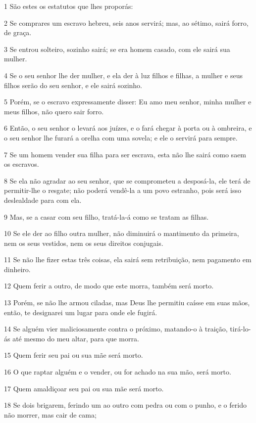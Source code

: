 \par 1 São estes os estatutos que lhes proporás:
\par 2 Se comprares um escravo hebreu, seis anos servirá; mas, ao sétimo, sairá forro, de graça.
\par 3 Se entrou solteiro, sozinho sairá; se era homem casado, com ele sairá sua mulher.
\par 4 Se o seu senhor lhe der mulher, e ela der à luz filhos e filhas, a mulher e seus filhos serão do seu senhor, e ele sairá sozinho.
\par 5 Porém, se o escravo expressamente disser: Eu amo meu senhor, minha mulher e meus filhos, não quero sair forro.
\par 6 Então, o seu senhor o levará aos juízes, e o fará chegar à porta ou à ombreira, e o seu senhor lhe furará a orelha com uma sovela; e ele o servirá para sempre.
\par 7 Se um homem vender sua filha para ser escrava, esta não lhe sairá como saem os escravos.
\par 8 Se ela não agradar ao seu senhor, que se comprometeu a desposá-la, ele terá de permitir-lhe o resgate; não poderá vendê-la a um povo estranho, pois será isso deslealdade para com ela.
\par 9 Mas, se a casar com seu filho, tratá-la-á como se tratam as filhas.
\par 10 Se ele der ao filho outra mulher, não diminuirá o mantimento da primeira, nem os seus vestidos, nem os seus direitos conjugais.
\par 11 Se não lhe fizer estas três coisas, ela sairá sem retribuição, nem pagamento em dinheiro.
\par 12 Quem ferir a outro, de modo que este morra, também será morto.
\par 13 Porém, se não lhe armou ciladas, mas Deus lhe permitiu caísse em suas mãos, então, te designarei um lugar para onde ele fugirá.
\par 14 Se alguém vier maliciosamente contra o próximo, matando-o à traição, tirá-lo-ás até mesmo do meu altar, para que morra.
\par 15 Quem ferir seu pai ou sua mãe será morto.
\par 16 O que raptar alguém e o vender, ou for achado na sua mão, será morto.
\par 17 Quem amaldiçoar seu pai ou sua mãe será morto.
\par 18 Se dois brigarem, ferindo um ao outro com pedra ou com o punho, e o ferido não morrer, mas cair de cama;
